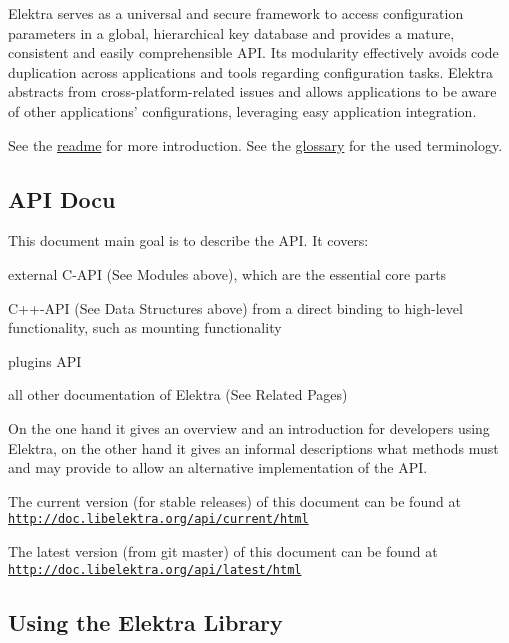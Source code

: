 Elektra serves as a universal and secure framework to access configuration parameters in a global, hierarchical key database and provides a mature, consistent and easily comprehensible A\+P\+I. Its modularity effectively avoids code duplication across applications and tools regarding configuration tasks. Elektra abstracts from cross-\/platform-\/related issues and allows applications to be aware of other applications' configurations, leveraging easy application integration.

See the \hyperlink{README_md}{readme} for more introduction. See the \hyperlink{md_doc_help_elektra-glossary_doc_help_elektra-glossary_md}{glossary} for the used terminology.

\subsection*{A\+P\+I Docu}

This document main goal is to describe the A\+P\+I. It covers\+:


\begin{DoxyItemize}
\item external C-\/\+A\+P\+I (See Modules above), which are the essential core parts
\item C++-\/\+A\+P\+I (See Data Structures above) from a direct binding to high-\/level functionality, such as mounting functionality
\item plugins A\+P\+I
\item all other documentation of Elektra (See Related Pages)
\end{DoxyItemize}

On the one hand it gives an overview and an introduction for developers using Elektra, on the other hand it gives an informal descriptions what methods must and may provide to allow an alternative implementation of the A\+P\+I.

The current version (for stable releases) of this document can be found at \href{http://doc.libelektra.org/api/current/html}{\tt http\+://doc.\+libelektra.\+org/api/current/html}

The latest version (from git master) of this document can be found at \href{http://doc.libelektra.org/api/latest/html}{\tt http\+://doc.\+libelektra.\+org/api/latest/html}

\subsection*{Using the Elektra Library}

